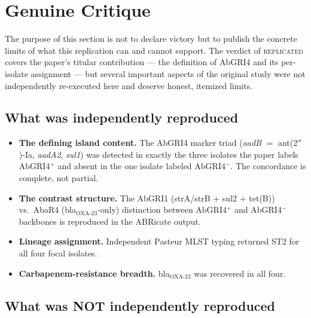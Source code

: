 \documentclass[11pt]{article}
\begin{document}
\section{Genuine Critique}

The purpose of this section is not to declare victory but to publish the concrete limits of what this
replication can and cannot support. The verdict of \textsc{replicated} covers the paper's titular contribution
--- the definition of AbGRI4 and its per-isolate assignment --- but several important aspects of the original
study were not independently re-executed here and deserve honest, itemized limits.

\subsection{What was independently reproduced}

\begin{itemize}
  \item \textbf{The defining island content.} The AbGRI4 marker triad (\emph{aadB} $=$ ant(2$''$)-Ia,
        \emph{aadA2}, \emph{sul1}) was detected in exactly the three isolates the paper labels AbGRI4$^+$
        and absent in the one isolate labeled AbGRI4$^-$. The concordance is complete, not partial.
  \item \textbf{The contrast structure.} The AbGRI1 (strA/strB $+$ sul2 $+$ tet(B)) vs.\ AbaR4 (bla$_{\text{OXA-23}}$-only)
        distinction between AbGRI4$^+$ and AbGRI4$^-$ backbones is reproduced in the ABRicate output.
  \item \textbf{Lineage assignment.} Independent Pasteur MLST typing returned ST2 for all four focal isolates.
  \item \textbf{Carbapenem-resistance breadth.} bla$_{\text{OXA-23}}$ was recovered in all four.
\end{itemize}

\subsection{What was NOT independently reproduced}
\end{document}
